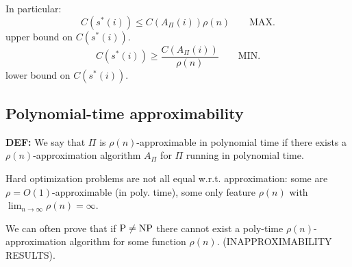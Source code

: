 In particular:
\[C(s^*(i))\leq C(A_\Pi(i))\rho(n)\qquad\text{MAX.}\]
upper bound on $C(s^*(i))$.
\[C(s^*(i))\geq\frac{C(A_\Pi(i))}{\rho(n)}\qquad\text{MIN.}\]
lower bound on $C(s^*(i))$.

\subsection{Polynomial-time approximability}
\begin{notesdefinition}
\textbf{DEF:} We say that $\Pi$ is $\rho(n)$-approximable in polynomial time if there exists a $\rho(n)$-approximation algorithm $A_\Pi$ for $\Pi$ running in polynomial time.
\end{notesdefinition}

Hard optimization problems are not all equal w.r.t. approximation: some are $\rho=O(1)$-approximable (in poly. time), some only feature $\rho(n)$ with $\lim_{n\to\infty}\rho(n)=\infty$.

We can often prove that if $\mathrm{P}\ne\mathrm{NP}$ there cannot exist a poly-time $\rho(n)$-approximation algorithm for some function $\rho(n)$. (INAPPROXIMABILITY RESULTS).
